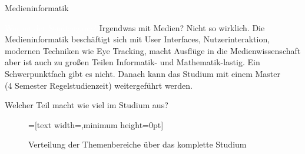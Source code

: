 
\begin{Huge}
    Medieninformatik
\end{Huge}

\begin{exampleblock}{\textcolor{white}{Was ist der Studiengang?}}
    Irgendwas mit Medien? Nicht so wirklich. Die Medieninformatik beschäftigt sich mit User Interfaces, Nutzerinteraktion, modernen Techniken wie Eye Tracking, macht Ausflüge in die Medienwissenschaft aber ist auch zu großen Teilen Informatik- und Mathematik-lastig. Ein Schwerpunktfach gibt es nicht. Danach kann das Studium mit einem Master \\ (4 Semester Regelstudienzeit) weitergeführt werden.
\end{exampleblock}

\begin{block}{Welcher Teil macht wie viel im Studium aus?}
    \begin{figure}[h!]
        \vspace{-10pt}
        \begin{minipage}{\linewidth}
            \centering
            =[text width={},minimum height=0pt]
        \end{minipage}
        \caption{Verteilung der Themenbereiche über das komplette Studium}
    \end{figure}
\end{block}

